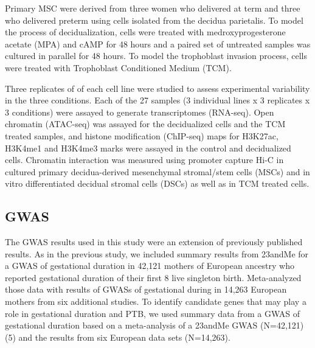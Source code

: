Primary MSC were derived from three women who delivered at term and three who delivered preterm using cells isolated from the decidua parietalis.
To model the process of decidualization, cells were treated with medroxyprogesterone acetate (MPA)
and cAMP for 48 hours and a paired set of untreated samples was cultured in parallel for 48 hours.
To model the trophoblast invasion process, cells were treated with Trophoblast Conditioned Medium (TCM).

Three replicates of of each cell line were studied to assess experimental variability in the three conditions.
Each of the 27 samples (3 individual lines x 3 replicates x 3 conditions) were assayed to generate transcriptomes (RNA-seq).
Open chromatin (ATAC-seq) was assayed for the decidualized cells and the TCM treated samples,
and histone modification (ChIP-seq) maps for H3K27ac, H3K4me1 and H3K4me3 marks were assayed in the control and decidualized cells.
Chromatin interaction was measured using promoter capture Hi-C in cultured primary decidua-derived mesenchymal stromal/stem cells (MSCs)
and in vitro differentiated decidual stromal cells (DSCs) as well as in TCM treated cells.



\subsection{GWAS}

The GWAS results used in this study were an extension of previously published results. As in the previous study, we included summary results from 23andMe
for a GWAS of gestational duration in 42,121 mothers of European ancestry who reported gestational duration of their first 8 live singleton birth.
Meta-analyzed those data with results of GWASs of gestational during in 14,263 European mothers from six additional studies.
To identify candidate genes that may play a role in gestational duration and PTB, we used summary data from a GWAS of gestational duration based on a meta-analysis of a 23andMe
GWAS (N=42,121)(5) and the results from six European data sets (N=14,263). 

